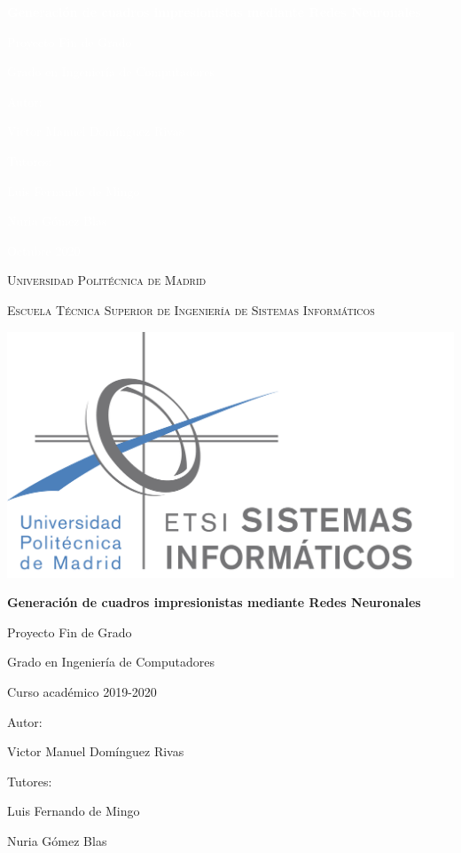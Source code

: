 \documentclass[a4paper]{report}
\begin{document}
\begin{titlepage}
{\bfseries\Huge \textcolor{white}{Generación de cuadros impresionistas mediante Redes Neuronales} \par}
\vfill
{\LARGE \textcolor{white}{Proyecto Fin de Grado} \par}
\vfill
{\LARGE \textcolor{white}{Grado en Ingeniería de Computadores} \par}
\vfill
{\LARGE \textcolor{white}{Autor:} \par}
{\LARGE \textcolor{white}{Victor Manuel Domínguez Rivas} \par}
\vfill
{\LARGE \textcolor{white}{Tutores:} \par}
{\LARGE \textcolor{white}{Luis Fernando de Mingo} \par}
{\LARGE \textcolor{white}{Nuria Gómez Blas} \par}
\vfill
{\LARGE \textcolor{white}{Octubre 2020} \par}
\newpage

\thispagestyle{empty}
\centering %
{\scshape\Large  Universidad Politécnica de Madrid \par}
{\scshape\Large Escuela Técnica Superior de Ingeniería de Sistemas Informáticos \par}
\vfill
{\includegraphics[width=1\textwidth]{logo_etsisi.png}\par}
\vfill
{\bfseries\LARGE Generación de cuadros impresionistas mediante Redes Neuronales \par}
\vfill
{\Large Proyecto Fin de Grado \par}
\vfill
{\Large Grado en Ingeniería de Computadores \par}
\vfill
{\Large Curso académico 2019-2020 \par}
\vfill
{\Large Autor: \par}
{\Large Victor Manuel Domínguez Rivas \par}
\vfill
{\Large Tutores: \par}
{\Large Luis Fernando de Mingo \par}
{\Large Nuria Gómez Blas \par}
\end{titlepage}
\end{document}
